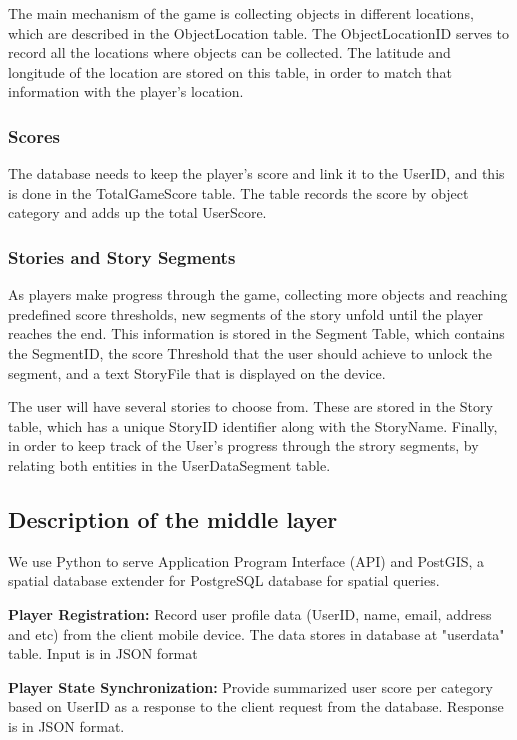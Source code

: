 \documentclass[conference]{IEEEtran}
\begin{document}
The main mechanism of the game is collecting objects in different locations, which are described in the ObjectLocation table. The ObjectLocationID serves to record all the locations where objects can be collected. The latitude and longitude of the location are stored on this table, in order to match that information with the player’s location.

\subsubsection*{Scores} 
The database needs to keep the player’s score and link it to the UserID, and this is done in the TotalGameScore table. The table records the score by object category and adds up the total UserScore. 

\subsubsection*{Stories and Story Segments}
As players make progress through the game, collecting more objects and reaching predefined score thresholds, new segments of the story unfold until the player reaches the end. This information is stored in the Segment Table, which contains the SegmentID, the score Threshold that the user should achieve to unlock the segment, and a text StoryFile that is displayed on the device. 

The user will have several stories to choose from. These are stored in the Story table, which has a unique StoryID identifier along with the StoryName. 
Finally, in order to keep track of the User’s progress through the strory segments, by relating both entities in the UserDataSegment table. 

\subsection{Description of the middle layer}

We use Python to serve Application Program Interface (API) and PostGIS, a spatial database extender for PostgreSQL database for spatial queries. 

\textbf{Player Registration:} Record user profile data (UserID, name, email, address and etc) from the client mobile device. The data stores in database at "userdata" table.  Input is in JSON format 

\textbf{Player State Synchronization:} Provide summarized user score per category based on UserID as a response to the client request from the database. Response is in JSON format.
\end{document}

